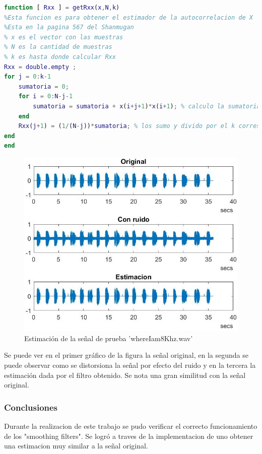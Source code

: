 \begin{lstlisting}[language=Matlab, caption=getRxx.m]
function [ Rxx ] = getRxx(x,N,k)
%Esta funcion es para obtener el estimador de la autocorrelacion de X
%Esta en la pagina 567 del Shanmugan
% x es el vector con las muestras
% N es la cantidad de muestras
% k es hasta donde calcular Rxx
Rxx = double.empty ;
for j = 0:k-1
    sumatoria = 0;
    for i = 0:N-j-1
        sumatoria = sumatoria + x(i+j+1)*x(i+1); % calculo la sumatoria
    end
    Rxx(j+1) = (1/(N-j))*sumatoria; % los sumo y divido por el k correspondiente
end
end

\end{lstlisting}


\begin{figure}[H] %
\centering
\includegraphics[scale=0.7]{../EJ2/EJ2.jpg}
\caption{Estimación de la señal de prueba 'whereIam8Khz.wav'}
\label{EstimacionWhereIam}
\end{figure}

Se puede ver en el primer gráfico de la figura la señal original, en la segunda se puede observar como se distorsiona la señal por efecto del ruido y en la tercera la estimación dada por el filtro obtenido. Se nota una gran similitud con la señal original.



\subsubsection{Conclusiones}
Durante la realizacion de este trabajo se pudo verificar el correcto funcionamiento de los "smoothing filters". Se logró a traves de la implementacion de uno obtener una estimacion muy similar a la señal original.



